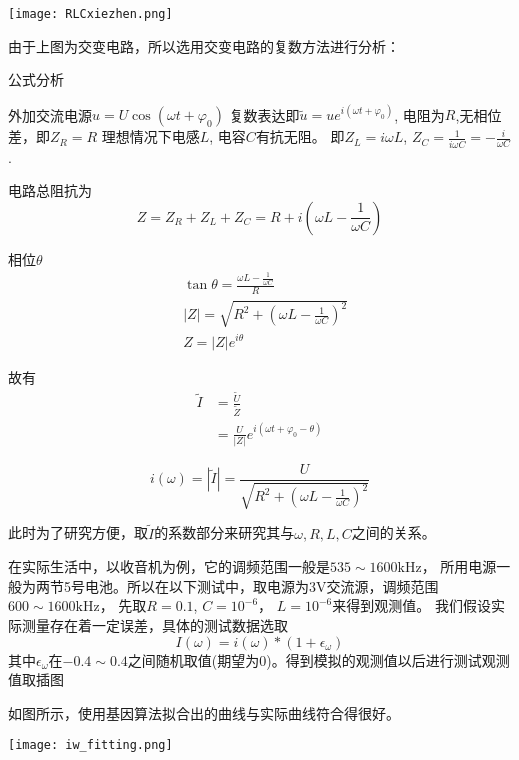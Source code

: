 \documentclass[a4paper]{article}
\begin{document}
\texttt{[image: RLCxiezhen.png]}

由于上图为交变电路，所以选用交变电路的复数方法进行分析：

公式分析

外加交流电源$u = U\cos(\omega t + \varphi_0)$ 复数表达即$\tilde{u} = u e^{i(\omega t + \varphi_0)}$,
电阻为$R$,无相位差，即$Z_R = R$
理想情况下电感$L$, 电容$C$有抗无阻。
即$Z_L = i\omega L$, $Z_C  = \frac{1}{i\omega C} = - \frac{i}{\omega C}$ .

电路总阻抗为
\begin{equation}
	Z = Z_R + Z_L + Z_C = R + i(\omega L - \frac{1}{\omega C})
\end{equation}

相位$\theta$
\begin{align}
	& \tan \theta = \frac{\omega L - \frac{1}{\omega C}}{R} \\
	& |Z| = \sqrt{R^2 + (\omega L - \frac{1}{\omega C})^2} \\
	& Z = |Z| e^{i\theta}
\end{align}

故有
\begin{equation}
	\begin{split}
		\tilde{I} &= \frac{\tilde{U}}{\tilde{Z}} \\
				&= \frac{U}{|Z|} e^{i(\omega t + \varphi_0 - \theta)}
	\end{split}
\end{equation}

\begin{equation}
	i(\omega) = |\tilde{I}|	 = \frac{U}{\sqrt{R^2 + (\omega L - \frac{1}{\omega C})^2}}
\end{equation}

此时为了研究方便，取$\tilde{I}$的系数部分来研究其与$\omega,R,  L, C$之间的关系。

在实际生活中，以收音机为例，它的调频范围一般是$535 \sim 1600 \text{kHz}$，
所用电源一般为两节5号电池。所以在以下测试中，取电源为$3 \text{V}$交流源，调频范围$600 \sim 1600 \text{kHz}$，
先取$R = 0.1$, $C=10^{-6}$， $L=10^{-6}$来得到观测值。 
我们假设实际测量存在着一定误差，具体的测试数据选取
\begin{equation}
	I(\omega) = i(\omega) * (1 + \epsilon_\omega)
\end{equation}
其中$\epsilon_\omega$在$-0.4 \sim 0.4$之间随机取值(期望为$0$)。得到模拟的观测值以后进行测试观测值取插图

如图所示，使用基因算法拟合出的曲线与实际曲线符合得很好。

\begin{center}
\texttt{[image: iw\_fitting.png]}
\end{center}
\end{document}
